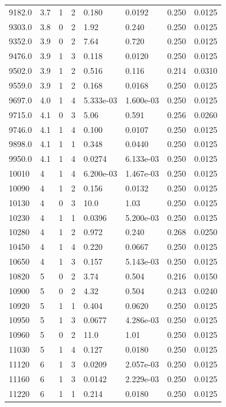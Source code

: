 \documentclass[preview]{standalone}
\begin{document}
{{{{{\begin{tabular}{L{1.2cm}C{1.2cm} C{0.3cm}C{0.5cm} C{1.4cm}C{1.4cm} C{1.4cm}C{1.4cm}}
  9182.0  &   3.7  & 1     &  2 &  0.180  & 0.0192  & 0.250 &  0.0125   \\ 
  9303.0  &   3.8  & 0     &  2 &  1.92  & 0.240  & 0.250 &  0.0125   \\ 
  9352.0  &   3.9  & 0     &  2 &  7.64  & 0.720  & 0.250 &  0.0125   \\ 
  9476.0  &   3.9  & 1     &  3 &  0.118  & 0.0120  & 0.250 &  0.0125   \\ 
  9502.0  &   3.9  & 1     &  2 &  0.516  & 0.116  & 0.214 &  0.0310   \\ 
  9559.0  &   3.9  & 1     &  2 &  0.168  & 0.0168  & 0.250 &  0.0125   \\ 
  9697.0  &   4.0  & 1     &  4 &  5.333e-03  & 1.600e-03  & 0.250 &  0.0125   \\ 
  9715.0  &   4.1  & 0     &  3 &  5.06  & 0.591  & 0.256 &  0.0260   \\ 
  9746.0  &   4.1  & 1     &  4 &  0.100  & 0.0107  & 0.250 &  0.0125   \\ 
  9898.0  &   4.1  & 1     &  1 &  0.348  & 0.0440  & 0.250 &  0.0125   \\ 
  9950.0  &   4.1  & 1     &  4 &  0.0274  & 6.133e-03  & 0.250 &  0.0125   \\ 
  10010  &     4  & 1     &  4 &  6.200e-03  & 1.467e-03  & 0.250 &  0.0125   \\ 
  10090  &     4  & 1     &  2 &  0.156  & 0.0132  & 0.250 &  0.0125   \\ 
  10130  &     4  & 0     &  3 &  10.0  & 1.03  & 0.250 &  0.0125   \\ 
  10230  &     4  & 1     &  1 &  0.0396  & 5.200e-03  & 0.250 &  0.0125   \\ 
  10280  &     4  & 1     &  2 &  0.972  & 0.240  & 0.268 &  0.0250   \\ 
  10450  &     4  & 1     &  4 &  0.220  & 0.0667  & 0.250 &  0.0125   \\ 
  10650  &     4  & 1     &  3 &  0.157  & 5.143e-03  & 0.250 &  0.0125   \\ 
  10820  &     5  & 0     &  2 &  3.74  & 0.504  & 0.216 &  0.0150   \\ 
  10900  &     5  & 0     &  2 &  4.32  & 0.504  & 0.243 &  0.0240   \\ 
  10920  &     5  & 1     &  1 &  0.404  & 0.0620  & 0.250 &  0.0125   \\ 
  10950  &     5  & 1     &  3 &  0.0677  & 4.286e-03  & 0.250 &  0.0125   \\ 
  10960  &     5  & 0     &  2 &  11.0  & 1.01  & 0.250 &  0.0125   \\ 
  11030  &     5  & 1     &  4 &  0.127  & 0.0180  & 0.250 &  0.0125   \\ 
  11120  &     6  & 1     &  3 &  0.0209  & 2.057e-03  & 0.250 &  0.0125   \\ 
  11160  &     6  & 1     &  3 &  0.0142  & 2.229e-03  & 0.250 &  0.0125   \\ 
  11220  &     6  & 1     &  1 &  0.214  & 0.0180  & 0.250 &  0.0125   \\ 
\hline 
\end{tabular} 

}}}}}
\end{document}
